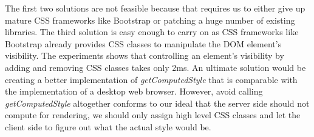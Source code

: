 The first two solutions are not feasible because that requires us to either give up
mature CSS frameworks like Bootstrap or patching a huge number of existing \js{} libraries.
The third solution is easy enough to carry on as CSS frameworks like Bootstrap already provides
CSS classes to manipulate the DOM element's visibility.
The experiments shows that controlling an element's visibility by
adding and removing CSS classes takes only 2ms.
An ultimate solution would be creating a better implementation of \emph{getComputedStyle}
that is comparable with the implementation of a desktop web browser.
However, 
avoid calling \emph{getComputedStyle} altogether conforms to our ideal 
that the server side should not compute for rendering,
we should only assign high level CSS classes and let the client side
to figure out what the actual style would be.


